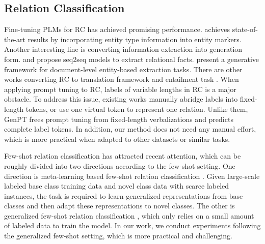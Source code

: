 \documentclass[11pt]{article}
\begin{document}
\subsection{Relation Classification}
Fine-tuning PLMs for RC  \cite{joshi-etal-2020-spanbert, yamada-etal-2020-luke, DBLP:conf/aaai/XueSZC21, lyu-chen-2021-relation} has achieved promising performance. \citet{DBLP:journals/corr/abs-2102-01373} achieves state-of-the-art results by incorporating entity type information into entity markers. Another interesting line is converting information extraction into generation form. \citet{zeng-etal-2018-extracting} and \citet{DBLP:conf/aaai/NayakN20} 
propose seq2seq models to extract relational facts. 
\citet{DBLP:conf/emnlp/HuangTP21} present a generative framework for document-level entity-based 
extraction tasks. There are other works converting RC to translation framework \cite{DBLP:conf/iclr/PaoliniAKMAASXS21, DBLP:conf/emnlp/WangLCH0S21} and entailment task \cite{DBLP:conf/emnlp/SainzLLBA21}. When applying prompt tuning to RC, labels of variable lengths in RC is a major obstacle. To address this issue, existing works \cite{DBLP:journals/corr/abs-2105-11259, DBLP:journals/corr/abs-2104-07650} manually abridge labels into fixed-length tokens, or use one virtual token to represent one relation. Unlike them, GenPT frees prompt tuning from fixed-length verbalizations and predicts complete label tokens. In addition, our method does not need any manual effort, which is more practical when adapted to other datasets or similar tasks.

Few-shot relation classification has attracted recent attention, which can be roughly divided into two directions according to the few-shot setting. One direction is meta-learning based few-shot relation classification \cite{DBLP:conf/emnlp/HanZYWYLS18, DBLP:conf/emnlp/Han0L21, DBLP:conf/cikm/Han0N21}. Given large-scale labeled base class training data and novel class data with scarce labeled instances, the task is required to learn generalized representations from base classes and then adapt these representations to novel classes. The other is generalized few-shot relation classification \cite{DBLP:conf/emnlp/SainzLLBA21, DBLP:journals/corr/abs-2105-11259, DBLP:journals/corr/abs-2104-07650}, which only relies on a small amount of labeled data to train the model. In our work, we conduct experiments following the generalized few-shot setting, which is more practical and challenging.

\begin{comment}
	\begin{figure}[t!]
\centering
		\texttt{[image: experiment\_guidance.pdf]}
		\caption{Case study to illustrate the effect of entity-guided decoding.}
		\label{case} 
	\end{figure}
\end{comment}
\end{document}
